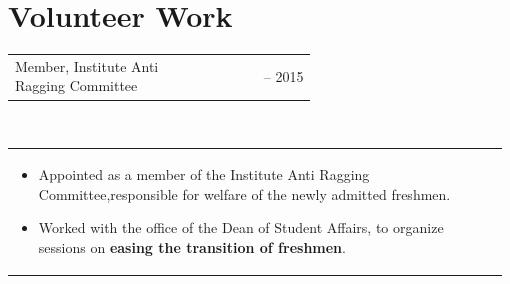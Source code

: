 \documentclass[a4paper]{article} %
\newcommand{\verticalspacing}{-0.25cm}
\newcommand{\headspace}{-0.3cm}
\newcommand{\bulletspace}{0.7cm}
\newcommand{\projectheadspacing}{6.9cm}
\newcommand{\gitproject}[3]{%
    \begin{tabular}{p{0.60\linewidth}r}
        \textcolor{NavyBlue}{\small #2} & \multicolumn{1}{m{ \projectheadspacing{} }}{\raggedleft #1}\\
    \end{tabular}\\
    \begin{tabular}{p{0.98\linewidth}}
        \vspace{\headspace{}}
        \small{#3}
    \end{tabular}
    \vspace{\verticalspacing{}}
    \vspace{-0.2cm} %
}
\newcommand{\skill}[2]{%
    \begin{tabular}{p{0.60\linewidth}r}
        \small {#2} & \multicolumn{1}{m{ \projectheadspacing{} }}{\raggedleft \textsc{\small #1}}\\
    \end{tabular}
    \vspace{\verticalspacing{}}
}
\begin{document}






\section{Volunteer Work}

\gitproject
    {2014 -- 2015}
    {Member, Institute Anti Ragging Committee}
    {%
        \begin{itemize}[leftmargin=\bulletspace{}]
            \item Appointed as a member of the Institute Anti Ragging Committee,responsible for welfare of the newly admitted freshmen.
            \item Worked with the office of the Dean of Student Affairs, to organize sessions on \textbf{easing the transition of freshmen}.
        \end{itemize}
    }
\end{document}
